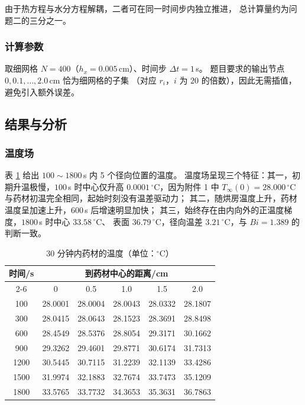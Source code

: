 \documentclass[12pt,a4paper,fontset=none]{ctexart}
\begin{document}
由于热方程与水分方程解耦，二者可在同一时间步内独立推进，
总计算量约为问题二的三分之一。

\subsubsection{计算参数}

取细网格 $N=400$（$h_x=0.005$\,cm）、时间步 $\Delta t=1$\,s。
题目要求的输出节点 $0,0.1,\dots,2.0$\,cm 恰为细网格的子集
（对应 $r_i$，$i$ 为 $20$ 的倍数），因此无需插值，避免引入额外误差。

\subsection{结果与分析}

\subsubsection{温度场}

表 \ref{tab:p1-T} 给出 $100\sim1800$\,s 内 5 个径向位置的温度。
温度场呈现三个特征：其一，初期升温极慢，$100$\,s 时中心仅升高
$0.0001\,^\circ$C，因为附件 1 中 $T_\infty(0)=28.000\,^\circ$C
与药材初温完全相同，起始时刻没有温差驱动力；
其二，随烘房温度上升，药材温度呈加速上升，$600$\,s 后增速明显加快；
其三，始终存在由内向外的正温度梯度，$1800$\,s 时中心 $33.58\,^\circ$C、
表面 $36.79\,^\circ$C，径向温差 $3.21\,^\circ$C，与 $Bi=1.389$ 的判断一致。

\begin{table}[htbp]
  \centering
  \caption{30 分钟内药材的温度（单位：$^\circ$C）}
  \label{tab:p1-T}
  \begin{tabular}{cccccc}
    \toprule
    \multirow{2}{*}{时间/s} & \multicolumn{5}{c}{到药材中心的距离/cm} \\
    \cmidrule(lr){2-6}
     & 0     & 0.5   & 1.0   & 1.5   & 2.0 \\
    \midrule
    100  & 28.0001 & 28.0004 & 28.0043 & 28.0332 & 28.1807 \\
    300  & 28.0415 & 28.0643 & 28.1523 & 28.3691 & 28.8498 \\
    600  & 28.4549 & 28.5376 & 28.8054 & 29.3171 & 30.1662 \\
    900  & 29.3262 & 29.4601 & 29.8771 & 30.6174 & 31.7313 \\
    1200 & 30.5445 & 30.7115 & 31.2239 & 32.1139 & 33.4286 \\
    1500 & 31.9974 & 32.1883 & 32.7674 & 33.7473 & 35.1209 \\
    1800 & 33.5765 & 33.7732 & 34.3653 & 35.3631 & 36.7863 \\
    \bottomrule
  \end{tabular}
\end{table}
\end{document}
